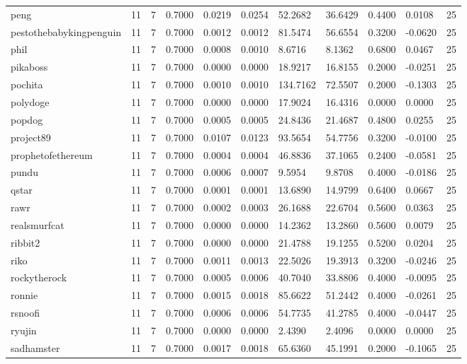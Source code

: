 \begin{table}[htbp]
\begin{tabular}{lllllllllll}
peng & 11 & 7 & 0.7000 & 0.0219 & 0.0254 & 52.2682 & 36.6429 & 0.4400 & 0.0108 & 25 \\
pestothebabykingpenguin & 11 & 7 & 0.7000 & 0.0012 & 0.0012 & 81.5474 & 56.6554 & 0.3200 & -0.0620 & 25 \\
phil & 11 & 7 & 0.7000 & 0.0008 & 0.0010 & 8.6716 & 8.1362 & 0.6800 & 0.0467 & 25 \\
pikaboss & 11 & 7 & 0.7000 & 0.0000 & 0.0000 & 18.9217 & 16.8155 & 0.2000 & -0.0251 & 25 \\
pochita & 11 & 7 & 0.7000 & 0.0010 & 0.0010 & 134.7162 & 72.5507 & 0.2000 & -0.1303 & 25 \\
polydoge & 11 & 7 & 0.7000 & 0.0000 & 0.0000 & 17.9024 & 16.4316 & 0.0000 & 0.0000 & 25 \\
popdog & 11 & 7 & 0.7000 & 0.0005 & 0.0005 & 24.8436 & 21.4687 & 0.4800 & 0.0255 & 25 \\
project89 & 11 & 7 & 0.7000 & 0.0107 & 0.0123 & 93.5654 & 54.7756 & 0.3200 & -0.0100 & 25 \\
prophetofethereum & 11 & 7 & 0.7000 & 0.0004 & 0.0004 & 46.8836 & 37.1065 & 0.2400 & -0.0581 & 25 \\
pundu & 11 & 7 & 0.7000 & 0.0006 & 0.0007 & 9.5954 & 9.8708 & 0.4000 & -0.0186 & 25 \\
qstar & 11 & 7 & 0.7000 & 0.0001 & 0.0001 & 13.6890 & 14.9799 & 0.6400 & 0.0667 & 25 \\
rawr & 11 & 7 & 0.7000 & 0.0002 & 0.0003 & 26.1688 & 22.6704 & 0.5600 & 0.0363 & 25 \\
realsmurfcat & 11 & 7 & 0.7000 & 0.0000 & 0.0000 & 14.2362 & 13.2860 & 0.5600 & 0.0079 & 25 \\
ribbit2 & 11 & 7 & 0.7000 & 0.0000 & 0.0000 & 21.4788 & 19.1255 & 0.5200 & 0.0204 & 25 \\
riko & 11 & 7 & 0.7000 & 0.0011 & 0.0013 & 22.5026 & 19.3913 & 0.3200 & -0.0246 & 25 \\
rockytherock & 11 & 7 & 0.7000 & 0.0005 & 0.0006 & 40.7040 & 33.8806 & 0.4000 & -0.0095 & 25 \\
ronnie & 11 & 7 & 0.7000 & 0.0015 & 0.0018 & 85.6622 & 51.2442 & 0.4000 & -0.0261 & 25 \\
rsnoofi & 11 & 7 & 0.7000 & 0.0006 & 0.0006 & 54.7735 & 41.2785 & 0.4000 & -0.0447 & 25 \\
ryujin & 11 & 7 & 0.7000 & 0.0000 & 0.0000 & 2.4390 & 2.4096 & 0.0000 & 0.0000 & 25 \\
sadhamster & 11 & 7 & 0.7000 & 0.0017 & 0.0018 & 65.6360 & 45.1991 & 0.2000 & -0.1065 & 25 \\

\end{tabular}
\end{table}
